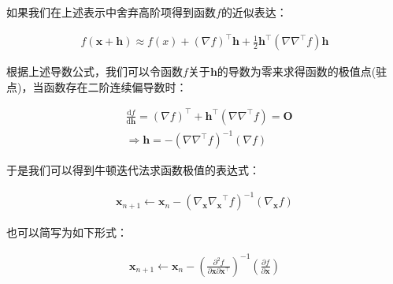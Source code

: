 \documentclass[UTF8]{book}
\begin{document}
如果我们在上述表示中舍弃高阶项得到函数$f$的近似表达：
\begin{large}
    \begin{equation}
        \begin{aligned}
            f(\mathbf{x}+\mathbf{h})\approx f(x)+(\nabla f)^\top \mathbf{h}+\frac{1}{2}\mathbf{h}^\top(\nabla \nabla^\top f)\mathbf{h}
            \nonumber
        \end{aligned}
    \end{equation}
\end{large}
根据上述导数公式，我们可以令函数$f$关于$\mathbf{h}$的导数为零来求得函数的极值点(驻点)，当函数存在二阶连续偏导数时：
\begin{large}
    \begin{equation}
        \begin{aligned}
            &\frac{\mathrm{d}f}{\mathrm{d}\mathbf{h}}=(\nabla f)^\top+\mathbf{h}^\top(\nabla \nabla^\top f)=\mathbf{O} \\
            &\Rightarrow \mathbf{h}=-(\nabla \nabla^\top f)^{-1}(\nabla f)
            \nonumber
        \end{aligned}
    \end{equation}
\end{large}
于是我们可以得到牛顿迭代法求函数极值的表达式：
\begin{large}
    \begin{equation}
        \begin{aligned}
            \mathbf{x}_{n+1} \gets \mathbf{x}_n-({\nabla_{\mathbf{x}} \nabla_{\mathbf{x}}}^\top f)^{-1}(\nabla_{\mathbf{x}} f)
            \nonumber
        \end{aligned}
    \end{equation}
\end{large}
也可以简写为如下形式：
\begin{large}
    \begin{equation}
        \begin{aligned}
            \mathbf{x}_{n+1} \gets \mathbf{x}_n-\left ( \frac{\partial^2 f}{\partial \mathbf{x}\partial \mathbf{x}^\top}\right )^{-1}\left (\frac{\partial f}{\partial \mathbf{x}}\right )
            \nonumber
        \end{aligned}
    \end{equation}
\end{large}
\end{document}
